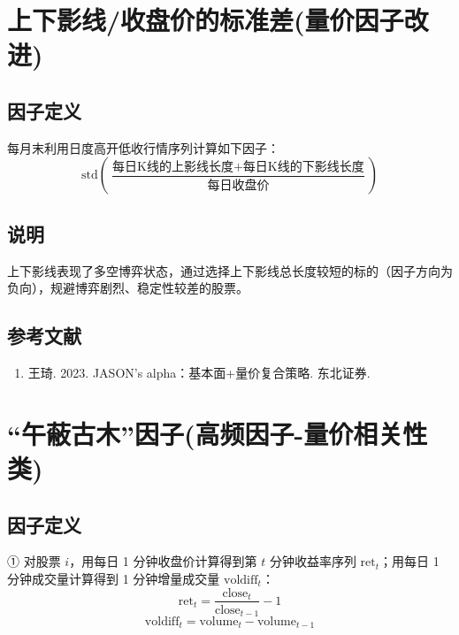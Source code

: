 \documentclass{article}
\begin{document}
\section{上下影线/收盘价的标准差(量价因子改进)}

\subsection{因子定义}

每月末利用日度高开低收行情序列计算如下因子：
\begin{equation}
    \mathrm{std}\left( \frac{\text{每日K线的上影线长度} + \text{每日K线的下影线长度}}{\text{每日收盘价}} \right)
\end{equation}

\subsection{说明}
上下影线表现了多空博弈状态，通过选择上下影线总长度较短的标的（因子方向为负向），规避博弈剧烈、稳定性较差的股票。

\subsection{参考文献}
\begin{enumerate}
    \item 王琦. 2023. JASON's alpha：基本面+量价复合策略. 东北证券.
\end{enumerate}

\section{“午蔽古木”因子(高频因子-量价相关性类)}

\subsection{因子定义}

① 对股票 \( i \)，用每日 1 分钟收盘价计算得到第 \( t \) 分钟收益率序列 \( \mathrm{ret}_t \)；用每日 1 分钟成交量计算得到 1 分钟增量成交量 \( \mathrm{voldiff}_t \)：
\begin{equation}
    \mathrm{ret}_t = \frac{\mathrm{close}_t}{\mathrm{close}_{t-1}} - 1
\end{equation}
\begin{equation}
    \mathrm{voldiff}_t = \mathrm{volume}_t - \mathrm{volume}_{t-1}
\end{equation}
\end{document}
